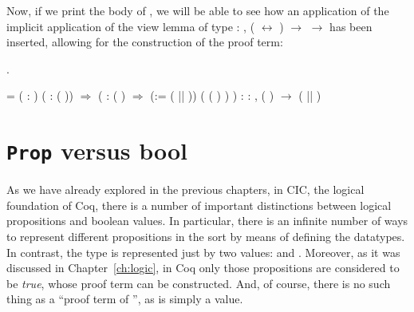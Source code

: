Now, if we print the body of , we will be able to see how an
application of the implicit application of the view lemma  of
type \coqdockw{\ensuremath{\forall}}   : , ( \ensuremath{\leftrightarrow} ) \ensuremath{\rightarrow}  \ensuremath{\rightarrow}  has been inserted,
allowing for the construction of the proof term:


\begin{coqdoccode}
\coqdocemptyline
\coqdocnoindent
{} .\coqdoceol
\coqdocemptyline
\end{coqdoccode}


\coqdoceol
\coqdocemptyline
\coqdocnoindent
{} = \coqdoceol
\coqdocindent{1.00em}
 ( : ) ( :  ( )) \ensuremath{\Rightarrow}\coqdoceol
\coqdocindent{1.00em}
(  :  ( ) \ensuremath{\Rightarrow}\coqdoceol
\coqdocindent{2.50em}
 (:= (  || )) ( ( ) ) ) \coqdoceol
\coqdocindent{2.50em}
: \coqdockw{\ensuremath{\forall}}  : ,  ( ) \ensuremath{\rightarrow}  (  || )

\coqdocemptyline




\section{\texttt{Prop} versus \textbf{\textsf{bool}}}


\label{sec:propbool}


As we have already explored in the previous chapters, in CIC, the
logical foundation of Coq, there is a number of important distinctions
between logical propositions and boolean values.  In particular, there
is an infinite number of ways to represent different propositions in
the sort  by means of defining the datatypes. In contrast, the
type  is represented just by two values:  and
. Moreover, as it was discussed in Chapter~\ref{ch:logic}, in
Coq only those propositions are considered to be \textit{true}, whose proof
term can be constructed. And, of course, there is no such thing as a
``proof term of '', as  is simply a value.


